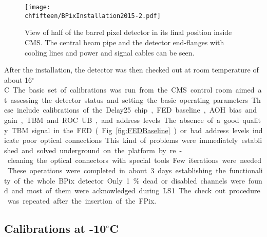 \begin{figure}[!htb]
 \begin{center}
 \texttt{[image: \\chfifteen/BPixInstallation2015-2.pdf]}
 \end{center}
 \caption{View of half of the barrel pixel detector in its final position inside CMS. The central beam pipe and the detector end-flanges with cooling lines and power and signal cables can be seen.}
 \label{fig:BPixInst3}
\end{figure}

After the installation, the detector was then checked out at room temperature of about 16\unit{$^\circ$C}.
The basic set of calibrations was run from the CMS control room aimed at assessing the detector status and setting the basic operating parameters.
These include calibrations of the Delay25 chip, FED baseline, AOH bias and gain, TBM and ROC UB, and address levels.
The absence of a good quality TBM signal in the FED (Fig.~\ref{fig:FEDBaseline}) or bad address levels indicate poor optical connections.
This kind of problems were immediately established and solved underground on the platform by re-cleaning the optical connectors with special tools.
Few iterations were needed.
These operations were completed in about 3 days establishing the functionality of the whole BPix detector.
Only 1\% dead or disabled channels were found and most of them were acknowledged during LS1.
The check out procedure was repeated after the insertion of the FPix.

\subsection{Calibrations at -10\unit{$^\circ$C}}\label{sec:FinalBPixCalib}

